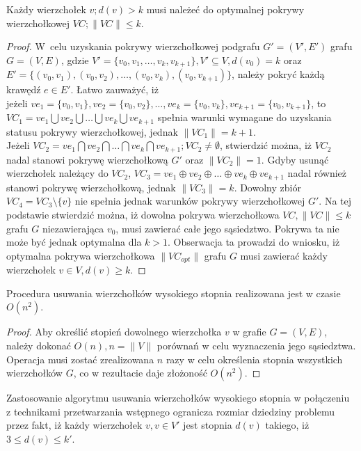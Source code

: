 \begin{theorem}
  Każdy wierzchołek $v; d(v) > k$ musi należeć do optymalnej pokrywy wierzchołkowej 
  $VC; \|VC\| \leq k$.
\end{theorem}
\begin{proof}
  W~celu uzyskania pokrywy wierzchołkowej podgrafu $G\prime=(V\prime,E\prime)$
  grafu $G=(V,E)$, gdzie $V\prime=\{v_0, v_1, \ldots, v_k, v_{k+1}\}, V\prime
  \subseteq V, d(v_0)=k$ oraz \\
  $E\prime=\{(v_0,v_1), (v_0,v_2), \ldots, (v_0, v_k), (v_0,v_{k+1})\}$,
  należy pokryć każdą krawędź $e \in E\prime$.
  Łatwo zauważyć, iż \\ jeżeli $ve_1=\{v_0,v_1\}, ve_2=\{v_0,v_2\}, \ldots,
  ve_k=\{v_0,v_k\},ve_{k+1}=\{v_0,v_{k+1}\}$,
  to ${VC_1=ve_1 \bigcup ve_2 \bigcup \ldots \bigcup ve_k \bigcup ve_{k+1}}$ spełnia warunki 
  wymagane do uzyskania statusu pokrywy wierzchołkowej, jednak $\|VC_1\| = k +1$.\\
  Jeżeli $VC_2=ve_1 \bigcap ve_2 \bigcap \ldots \bigcap ve_k \bigcap ve_{k+1}; VC_2 \neq \emptyset$,
  stwierdzić można, iż $VC_2$ nadal stanowi pokrywę wierzchołkową $G\prime$ oraz
  $\|VC_2\|=1$.
  Gdyby usunąć wierzchołek należący do $VC_2$, $VC_3=ve_1 \oplus ve_2 \oplus \ldots \oplus ve_k \oplus ve_{k+1}$ nadal
  również stanowi pokrywę wierzchołkową, jednak $\|VC_3\|=k$.
  Dowolny zbiór $VC_4=VC_3 \setminus \{v\}$ nie spełnia jednak warunków pokrywy
  wierzchołkowej $G\prime$.
  Na tej podstawie stwierdzić można, iż dowolna pokrywa wierzchołkowa 
  $VC, \|VC\| \leq k$ grafu $G$ niezawierająca $v_0$, musi zawierać całe jego
  sąsiedztwo. Pokrywa ta nie może być jednak optymalna dla $k > 1$.
  Obserwacja ta prowadzi do wniosku, iż optymalna pokrywa wierzchołkowa
  $\|VC_{opt}\|$ grafu $G$ musi zawierać każdy wierzchołek $v \in V, d(v) \geq k$.
\end{proof}

\begin{theorem}
  Procedura usuwania wierzchołków wysokiego stopnia realizowana jest w czasie
  $O(n^2)$.
\end{theorem}
\begin{proof}
  Aby określić stopień dowolnego wierzchołka $v$ w grafie $G=(V,E)$, należy 
  dokonać $O(n), n=\|V\|$ porównań w celu wyznaczenia jego sąsiedztwa.
  Operacja musi zostać zrealizowana $n$ razy w celu określenia stopnia
  wszystkich wierzchołków $G$, co w rezultacie daje złożoność $O (n^2)$.
\end{proof}

Zastosowanie algorytmu usuwania wierzchołków wysokiego stopnia w połączeniu z
technikami przetwarzania wstępnego ogranicza rozmiar dziedziny problemu przez
fakt, iż każdy wierzchołek $v, v \in V\prime$ jest stopnia $d(v)$ takiego, iż
$3 \leq d(v) \leq k\prime$.

